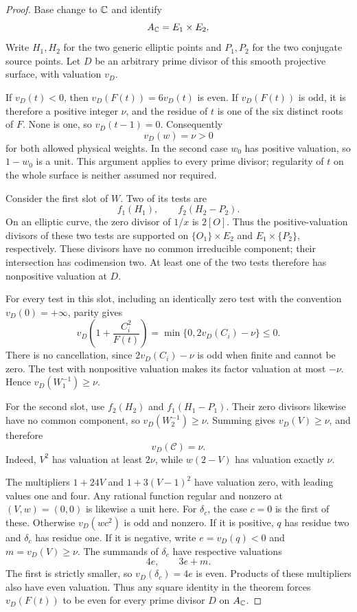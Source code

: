 \documentclass[11pt,a4paper]{article}
\begin{document}
\begin{proof}
Base change to $\mathbb C$ and identify
\[
                          A_{\mathbb C}=E_1\times E_2.
\]
Write $H_1,H_2$ for the two generic elliptic points and $P_1,P_2$
for the two conjugate source points. Let $D$ be an arbitrary prime
divisor of this smooth projective surface, with valuation $v_D$.

If $v_D(t)<0$, then $v_D(F(t))=6v_D(t)$ is even. If
$v_D(F(t))$ is odd, it is therefore a positive integer $\nu$, and
the residue of $t$ is one of the six distinct roots of $F$.
None is one, so $v_D(t-1)=0$. Consequently
\[
                            v_D(w)=\nu>0
\]
for both allowed physical weights. In the second case $w_0$ has
positive valuation, so $1-w_0$ is a unit. This argument applies
to every prime divisor; regularity of $t$ on the whole surface
is neither assumed nor required.

Consider the first slot of $W$. Two of its tests are
\[
                          f_1(H_1),\qquad f_2(H_2-P_2).
\]
On an elliptic curve, the zero divisor of $1/x$ is $2[O]$.
Thus the positive-valuation divisors of these two tests are
supported on $\{O_1\}\times E_2$ and $E_1\times\{P_2\}$,
respectively. These divisors have no common irreducible component;
their intersection has codimension two. At least one of the two
tests therefore has nonpositive valuation at $D$.

For every test in this slot, including an identically zero test
with the convention $v_D(0)=+\infty$, parity gives
\[
 v_D\left(1+\frac{C_i^2}{F(t)}\right)
                     =\min\{0,2v_D(C_i)-\nu\}\le0.
\]
There is no cancellation, since $2v_D(C_i)-\nu$ is odd when
finite and cannot be zero. The test with nonpositive valuation
makes its factor valuation at most $-\nu$. Hence
$v_D(W_1^{-1})\ge\nu$.

For the second slot, use $f_2(H_2)$ and $f_1(H_1-P_1)$.
Their zero divisors likewise have no common component, so
$v_D(W_2^{-1})\ge\nu$. Summing gives $v_D(V)\ge\nu$,
and therefore
\[
                  v_D(\mathcal C)=\nu.
\]
Indeed, $V^2$ has valuation at least $2\nu$, while $w(2-V)$
has valuation exactly $\nu$.

The multipliers $1+24V$ and $1+3(V-1)^2$ have valuation zero,
with leading values one and four. Any rational function regular
and nonzero at $(V,w)=(0,0)$ is likewise a unit here.
For $\delta_c$, the case $c=0$
is the first of these. Otherwise $v_D(wc^2)$ is odd and nonzero.
If it is positive, $q$ has residue two and $\delta_c$ has residue
one. If it is negative, write $e=v_D(q)<0$ and $m=v_D(V)\ge\nu$.
The summands of $\delta_c$ have respective valuations
\[
                              4e,\qquad 3e+m.
\]
The first is strictly smaller, so $v_D(\delta_c)=4e$ is even.
Products of these multipliers also have even valuation. Thus any
square identity in the theorem forces $v_D(F(t))$ to be even
for every prime divisor $D$ on $A_{\mathbb C}$.


\end{proof}
\end{document}
